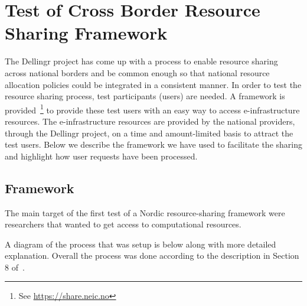 \documentclass{article}
\newcommand{\dell}{Dellingr\xspace}
\newcommand{\einfra}{e-infrastructure\xspace}
\newcommand{\np}{national provider\xspace}
\newcommand{\nps}{\np{s}\xspace}
\newcommand{\pilot}{first test of a Nordic resource-sharing framework\xspace}
\begin{document}
\section{Test of Cross Border Resource Sharing Framework}

The \dell project has come up with a process to enable resource sharing across national borders and be common enough so that national resource allocation policies could be integrated in a consistent manner.
In order to test the resource sharing process, test participants (users) are needed.
A framework is provided~\footnote{See \url{https://share.neic.no}} to provide these test users with an easy way to access \einfra resources.
The \einfra resources are provided by the \nps, through the \dell project, on a time and amount-limited basis to attract the test users.
Below we describe the framework we have used to facilitate the sharing and highlight how user requests have been processed.

\subsection{Framework}
\label{ssec:framework}

The main target of the \pilot were researchers that wanted to get access to computational resources.

A diagram of the process that was setup is below along with more detailed explanation. 
Overall the process was done according to the description in Section 8 
of~\cite{dellingr-p2-do5}.
\end{document}
